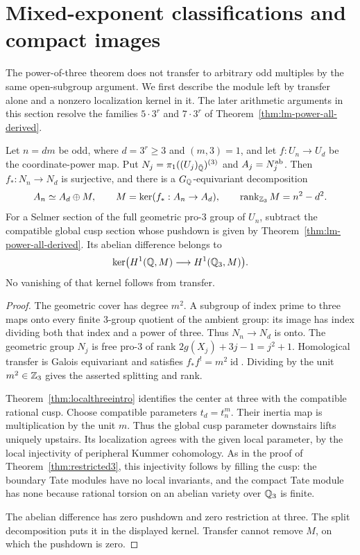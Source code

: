\section{Mixed-exponent classifications and compact images}
\label{sec:mixed-exponents}

The power-of-three theorem does not transfer to arbitrary odd
multiples by the same open-subgroup argument. We first describe the
module left by transfer alone and a nonzero localization kernel in it.
The later arithmetic arguments in this section resolve the families
$5\cdot3^r$ and $7\cdot3^r$ of Theorem~\ref{thm:lm-power-all-derived}.

\begin{proposition}
\label{prop:mixed-transfer}
Let $n=dm$ be odd, where $d=3^r\ge3$ and $(m,3)=1$, and let
$f:U_n\to U_d$ be the coordinate-power map. Put
$N_j=\pi_1((U_j)_{\bar{\mathbb Q}})^{(3)}$ and $A_j=N_j^{\mathrm{ab}}$.
Then $f_*:N_n\to N_d$ is surjective, and there is a
$G_\mathbb Q$-equivariant decomposition
\[
A_n\simeq A_d\oplus M,\qquad
M=\ker(f_*:A_n\to A_d),\qquad
\operatorname{rank}_{\mathbb Z_3}M=n^2-d^2.
\]
For a Selmer section of the full geometric pro-$3$ group of $U_n$,
subtract the compatible global cusp section whose pushdown is
given by Theorem~\ref{thm:lm-power-all-derived}. Its abelian difference
belongs to
\[
\ker\bigl(H^1(\mathbb Q,M)\longrightarrow H^1(\mathbb Q_3,M)\bigr).
\]
No vanishing of that kernel follows from transfer.
\end{proposition}
\begin{proof}
The geometric cover has degree $m^2$. A subgroup of index prime
to three maps onto every finite $3$-group quotient of the ambient
group: its image has index dividing both that index and a power
of three. Thus $N_n\to N_d$ is onto. The geometric group $N_j$
is free pro-$3$ of rank
$2g(X_j)+3j-1=j^2+1$. Homological transfer is Galois equivariant
and satisfies $f_*f^!=m^2\operatorname{id}$. Dividing by the
unit $m^2\in\mathbb Z_3$ gives the asserted splitting and rank.

Theorem~\ref{thm:localthreeintro} identifies the center at three
with the compatible rational cusp. Choose compatible parameters
$t_d=t_n^m$. Their inertia map is multiplication by the unit $m$.
Thus the global cusp parameter downstairs lifts uniquely upstairs.
Its localization agrees with the given local parameter, by the
local injectivity of peripheral Kummer cohomology. As in the proof
of Theorem~\ref{thm:restricted3}, this injectivity follows by
filling the cusp: the boundary Tate modules have no local
invariants, and the compact Tate module has none because rational
torsion on an abelian variety over $\mathbb Q_3$ is finite.

The abelian difference has zero pushdown and zero restriction
at three. The split decomposition puts it in the displayed
kernel. Transfer cannot remove $M$, on which the pushdown is zero.
\end{proof}

